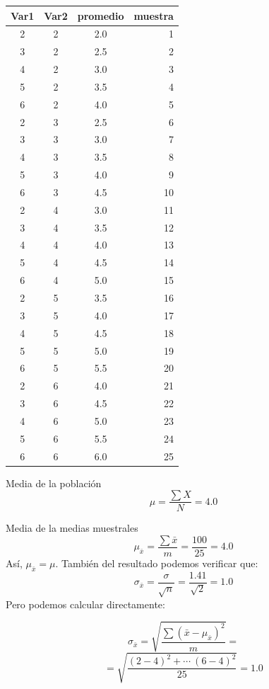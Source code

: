 \documentclass[
  10pt,
  ignorenonframetext,
]{beamer}
\begin{document}
\begin{frame}{}
\protect\hypertarget{section-16}{}
\begin{minipage}{\textwidth}

\begin{multicols}{2}


\begin{table}
\centering\begingroup\fontsize{7}{9}\selectfont

\begin{tabular}{c|c|c|r}
\hline
Var1 & Var2 & promedio & muestra\\
\hline
2 & 2 & 2.0 & 1\\
\hline
3 & 2 & 2.5 & 2\\
\hline
4 & 2 & 3.0 & 3\\
\hline
5 & 2 & 3.5 & 4\\
\hline
6 & 2 & 4.0 & 5\\
\hline
2 & 3 & 2.5 & 6\\
\hline
3 & 3 & 3.0 & 7\\
\hline
4 & 3 & 3.5 & 8\\
\hline
5 & 3 & 4.0 & 9\\
\hline
6 & 3 & 4.5 & 10\\
\hline
2 & 4 & 3.0 & 11\\
\hline
3 & 4 & 3.5 & 12\\
\hline
4 & 4 & 4.0 & 13\\
\hline
5 & 4 & 4.5 & 14\\
\hline
6 & 4 & 5.0 & 15\\
\hline
2 & 5 & 3.5 & 16\\
\hline
3 & 5 & 4.0 & 17\\
\hline
4 & 5 & 4.5 & 18\\
\hline
5 & 5 & 5.0 & 19\\
\hline
6 & 5 & 5.5 & 20\\
\hline
2 & 6 & 4.0 & 21\\
\hline
3 & 6 & 4.5 & 22\\
\hline
4 & 6 & 5.0 & 23\\
\hline
5 & 6 & 5.5 & 24\\
\hline
6 & 6 & 6.0 & 25\\
\hline
\end{tabular}
\endgroup{}
\end{table}

Media de la población
$$\mu = \frac{\sum X}{N} = 4.0$$

Media de la medias muestrales
$$\mu_{\bar{x}}=\frac{\sum \bar{x}}{m}= \frac{100}{25} = 4.0$$
Así, $\mu_{\bar{x}}=\mu$. También del resultado podemos verificar que:
$$\sigma_{\bar{x}}=\frac{\sigma}{\sqrt{n}}=\frac{1.41}{\sqrt{2}}=1.0$$
Pero podemos calcular directamente:

$$\sigma_{\bar{x}}=\sqrt{\frac{\sum (\bar{x}-\mu_{\bar{x}})^2}{m}}=$$ $$=\sqrt{\frac{(2-4)^2 + \cdots \ (6-4)^2}{25}}=1.0$$

\end{multicols}

\end{minipage}
\end{frame}
\end{document}
